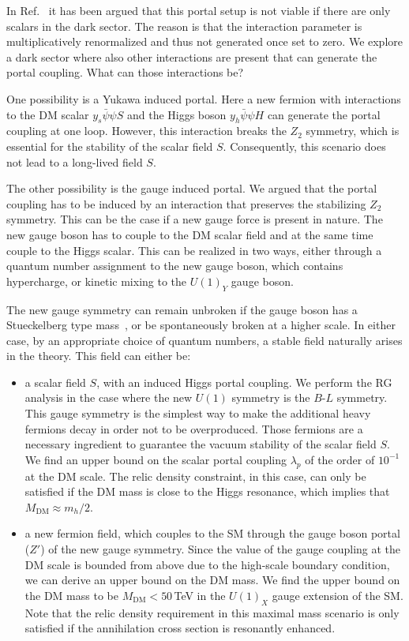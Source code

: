 \documentclass[aps,prd,twocolumn,preprintnumbers,superscriptaddress,nobibnotes,floatfix,longbibliography]{revtex4-1}
\newcommand{\MDM}{M_{\text{DM}}}
\begin{document}
In Ref.~\cite{Eichhorn:2017als} it has been argued that this portal setup is not viable if there are only scalars in the dark sector.
The reason is that the interaction parameter is multiplicatively renormalized and thus not generated once set to zero.
We explore a dark sector where also other interactions are present that can generate the portal coupling. What can those interactions be?

One possibility is a Yukawa induced portal. Here a new fermion with interactions to the DM scalar $y_s \bar{\psi} \psi S$ and the Higgs boson $y_h \bar{\psi} \psi H$ can generate the portal coupling at one loop. However, this interaction breaks the $Z_2$ symmetry, which is essential for the stability of the scalar field $S$. Consequently, this scenario does not lead to a long-lived field $S$.

The other possibility is the gauge induced portal. We argued that the portal coupling has to be induced by an interaction that preserves the stabilizing $Z_2$ symmetry. This can be the case if a new gauge force is present in nature. The new gauge boson has to couple to the DM scalar field and at the same time couple to the Higgs scalar. This can be realized in two ways, either through a quantum number assignment to the new gauge boson, which contains hypercharge, or kinetic mixing to the $U(1)_Y$ gauge boson. 

The new gauge symmetry can remain unbroken if the gauge boson has a Stueckelberg type mass~\cite{1506.05107}, or be spontaneously broken at a higher scale. In either case, by an appropriate choice of quantum numbers, a stable field naturally arises in the theory. This field can either be: 
\begin{itemize}
\item a scalar field $S$, with an induced Higgs portal coupling. 
We perform the RG analysis in the case where the new $U(1)$ symmetry is the $B$-$L$ symmetry.
This gauge symmetry is the simplest way to make the additional heavy fermions decay in order not to be overproduced. Those fermions are a necessary ingredient to guarantee the vacuum stability of the scalar field $S$. 
We find an upper bound on the scalar portal coupling $\lambda_p$ of the order of $10^{-1}$ at the DM scale. The relic density constraint, in this case, can only be satisfied if the DM mass is close to the Higgs resonance, which implies that $\MDM \approx m_h/2$. 
\item a new fermion field, which couples to the SM through the gauge boson portal ($Z'$) of the new gauge symmetry. Since the value of the gauge coupling at the DM scale is bounded from above due to the high-scale boundary condition, we can derive an upper bound on the DM mass. We find the upper bound on the DM mass to be $\MDM < 50$\,TeV in the $U(1)_X$ gauge extension of the SM. Note that the relic density requirement in this maximal mass scenario is only satisfied if the annihilation cross section is resonantly enhanced. 
\end{itemize}
\end{document}
